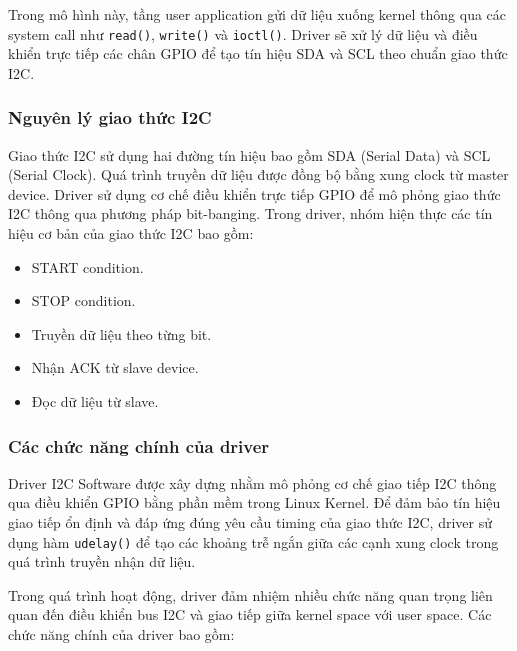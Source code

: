 Trong mô hình này, tầng user application gửi dữ liệu xuống kernel thông qua các system call như \texttt{read()}, \texttt{write()} và \texttt{ioctl()}. Driver sẽ xử lý dữ liệu và điều khiển trực tiếp các chân GPIO để tạo tín hiệu SDA và SCL theo chuẩn giao thức I2C.

\subsubsection{Nguyên lý giao thức I2C}

Giao thức I2C sử dụng hai đường tín hiệu bao gồm SDA (Serial Data) và SCL (Serial Clock). Quá trình truyền dữ liệu được đồng bộ bằng xung clock từ master device.
Driver sử dụng cơ chế điều khiển trực tiếp GPIO để mô phỏng giao thức I2C thông qua phương pháp bit-banging.
Trong driver, nhóm hiện thực các tín hiệu cơ bản của giao thức I2C bao gồm:

\begin{itemize}
    \item START condition.
    \item STOP condition.
    \item Truyền dữ liệu theo từng bit.
    \item Nhận ACK từ slave device.
    \item Đọc dữ liệu từ slave.
\end{itemize}

\subsubsection{Các chức năng chính của driver}

Driver I2C Software được xây dựng nhằm mô phỏng cơ chế giao tiếp I2C thông qua điều khiển GPIO bằng phần mềm trong Linux Kernel. Để đảm bảo tín hiệu giao tiếp ổn định và đáp ứng đúng yêu cầu timing của giao thức I2C, driver sử dụng hàm \texttt{udelay()} để tạo các khoảng trễ ngắn giữa các cạnh xung clock trong quá trình truyền nhận dữ liệu.

Trong quá trình hoạt động, driver đảm nhiệm nhiều chức năng quan trọng liên quan đến điều khiển bus I2C và giao tiếp giữa kernel space với user space. Các chức năng chính của driver bao gồm:

